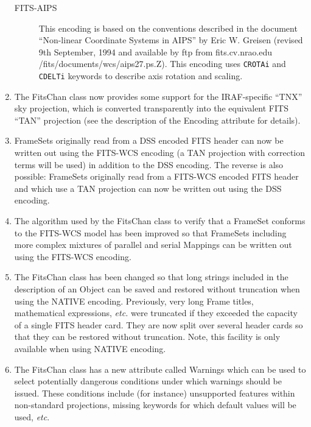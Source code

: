 \documentclass[twoside,11pt]{starlink}
\begin{document}
\begin{enumerate}
\begin{description}
\item [FITS-AIPS] This encoding is based on the conventions described in the
document ``Non-linear Coordinate Systems in AIPS'' by Eric W. Greisen
(revised 9th September, 1994 and available by ftp from fits.cv.nrao.edu
/fits/documents/wcs/aips27.ps.Z). This encoding uses \texttt{CROTAi} and
\texttt{CDELTi} keywords to describe axis rotation and scaling.

\end{description}

\item The FitsChan class now provides some support for the IRAF-specific
``TNX'' sky projection, which is converted transparently into the
equivalent FITS ``TAN'' projection (see the description of the Encoding
attribute for details).

\item FrameSets originally read from a DSS encoded FITS header can now be
written out using the FITS-WCS encoding (a TAN projection with correction
terms will be used) in addition to the DSS encoding. The reverse is also
possible: FrameSets originally read from a FITS-WCS encoded FITS header
and which use a TAN projection can now be written out using the DSS
encoding.

\item The algorithm used by the FitsChan class to verify that a FrameSet
conforms to the FITS-WCS model has been improved so that FrameSets
including more complex mixtures of parallel and serial Mappings
can be written out using the FITS-WCS encoding.

\item The FitsChan class has been changed so that long strings included in
the description of an Object can be saved and restored without truncation
when using the NATIVE encoding. Previously, very long Frame titles,
mathematical expressions, \emph{etc.} were truncated if they exceeded the
capacity of a single FITS header card. They are now split over several
header cards so that they can be restored without truncation. Note, this
facility is only available when using NATIVE encoding.

\item The FitsChan class has a new attribute called Warnings which
can be used to select potentially dangerous conditions under which
warnings should be issued. These conditions include (for instance)
unsupported features within non-standard projections, missing keywords
for which default values will be used, \emph{etc}.


\end{enumerate}
\end{document}
